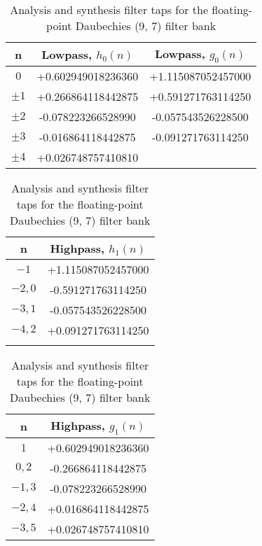 \begin{table}
    \centering
    \caption{Analysis and synthesis filter taps for the floating-point Daubechies (9, 7) filter bank}
    \label{tab:anal_synth_97i}
\begin{tabular}{ccc}
    \toprule
    n         & Lowpass, $h_{0}(n)$ & Lowpass, $g_{0}(n)$ \\
    \midrule
    $0$       & +0.602949018236360  & +1.115087052457000  \\
    $\pm 1$   & +0.266864118442875  & +0.591271763114250  \\
    $\pm 2$   & -0.078223266528990  & -0.057543526228500  \\
    $\pm 3$   & -0.016864118442875  & -0.091271763114250  \\
    $\pm 4$   & +0.026748757410810  &                     \\
    \bottomrule
\end{tabular}

\bigskip
\bigskip


\begin{tabular}{cc}
    \toprule
    n         & Highpass, $h_{1}(n)$ \\
    \midrule
    $-1$      & +1.115087052457000   \\
    $-2, 0$   & -0.591271763114250   \\
    $-3, 1$   & -0.057543526228500   \\
    $-4, 2$   & +0.091271763114250   \\
              &                      \\
    \bottomrule
\end{tabular}
\quad
\begin{tabular}{cc}
    \toprule
    n        & Highpass, $g_{1}(n)$ \\
    \midrule
    $1$      & +0.602949018236360   \\
    $0, 2$   & -0.266864118442875   \\
    $-1, 3$  & -0.078223266528990   \\
    $-2, 4$  & +0.016864118442875   \\
    $-3, 5$  & +0.026748757410810   \\
    \bottomrule
\end{tabular}
\end{table}

